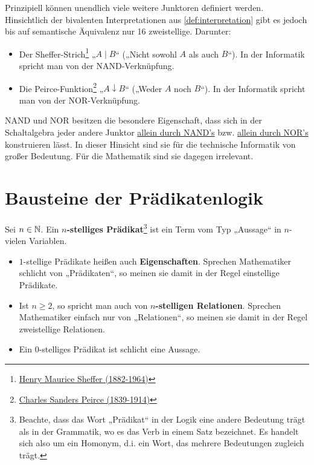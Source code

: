 	
\begin{vorschau}
    Prinzipiell können unendlich viele weitere Junktoren definiert werden. Hinsichtlich der bivalenten Interpretationen aus \cref{def:interpretation} gibt es jedoch bis auf semantische Äquivalenz nur 16 zweistellige. Darunter:
    \begin{itemize}
        \item Der Sheffer-Strich\footnote{\href{https://de.wikipedia.org/wiki/Henry_Maurice_Sheffer}{Henry Maurice Sheffer (1882-1964)}} „$A\mid B$“ („Nicht sowohl $A$ als auch $B$“). In der Informatik spricht man von der NAND-Verknüpfung.
        \item Die Peirce-Funktion\footnote{\href{https://de.wikipedia.org/wiki/Charles_Sanders_Peirce}{Charles Sanders Peirce (1839-1914)}} „$A\downarrow B$“ („Weder $A$ noch $B$“). In der Informatik spricht man von der NOR-Verknüpfung.
    \end{itemize}
    NAND und NOR besitzen die besondere Eigenschaft, dass sich in der Schaltalgebra jeder andere Junktor \href{https://en.wikipedia.org/wiki/NAND_logic}{allein durch NAND's} bzw. \href{https://en.wikipedia.org/wiki/NOR_logic}{allein durch NOR's} konstruieren lässt. In dieser Hinsicht sind sie für die technische Informatik von großer Bedeutung. Für die Mathematik sind sie dagegen irrelevant.
\end{vorschau}




	
\section{Bausteine der Prädikatenlogik}


\begin{defin}[Prädikat] \label{def:praedikat}  
    Sei $n\in \mathbb N$. Ein \textbf{$n$-stelliges Prädikat}\footnote{Beachte, dass das Wort „Prädikat“ in der Logik eine andere Bedeutung trägt als in der Grammatik, wo es das Verb in einem Satz bezeichnet. Es handelt sich also um ein Homonym, d.i. ein Wort, das mehrere Bedeutungen zugleich trägt.} ist ein Term vom Typ „Aussage“ in $n$-vielen Variablen.
    \begin{itemize}
        \item $1$-stellige Prädikate heißen auch \textbf{Eigenschaften}. Sprechen Mathematiker schlicht von „Prädikaten“, so meinen sie damit in der Regel einstellige Prädikate.
        \item Ist $n\ge 2$, so spricht man auch von \textbf{$n$-stelligen Relationen}. Sprechen Mathematiker einfach nur von „Relationen“, so meinen sie damit in der Regel zweistellige Relationen.
        \item Ein $0$-stelliges Prädikat ist schlicht eine Aussage.
    \end{itemize}
\end{defin}


